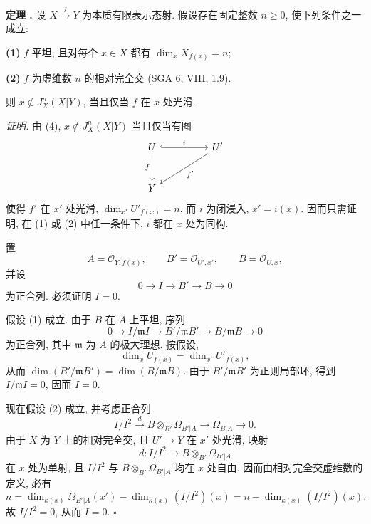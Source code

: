 
\medskip
\noindent\textbf{定理 .}
设 $X\xrightarrow{f}Y$ 为本质有限表示态射. 假设存在固定整数 $n\geq0$, 使下列条件之一成立:

\smallskip
\noindent\textbf{(1)} $f$ 平坦, 且对每个 $x\in X$ 都有 $\dim_xX_{f(x)}=n$;

\smallskip
\noindent\textbf{(2)} $f$ 为虚维数 $n$ 的相对完全交 (SGA 6, VIII, 1.9).

\smallskip
则 $x\notin J_X^n(X|Y)$, 当且仅当 $f$ 在 $x$ 处光滑.

\smallskip
\noindent\textit{证明.}
由 (4), $x\notin J_X^n(X|Y)$ 当且仅当有图
\[
\begin{tikzcd}[column sep=huge,row sep=large]
U \arrow[r,hook,"i"] \arrow[d,"f"']
  & U' \arrow[dl,"f'"] \\
Y & {}
\end{tikzcd}
\]
使得 $f'$ 在 $x'$ 处光滑, $\dim_{x'}U'_{f(x)}=n$, 而 $i$ 为闭浸入, $x'=i(x)$. 因而只需证明, 在 (1) 或 (2) 中任一条件下, $i$ 都在 $x$ 处为同构.

置
\[
A=\mathcal O_{Y,f(x)},\qquad
B'=\mathcal O_{U',x'},\qquad B=\mathcal O_{U,x},
\]
并设
\[
0\longrightarrow I\longrightarrow B'\longrightarrow B
\longrightarrow0
\]
为正合列. 必须证明 $I=0$.

假设 (1) 成立. 由于 $B$ 在 $A$ 上平坦, 序列
\[
0\longrightarrow I/\mathfrak mI
\longrightarrow B'/\mathfrak mB'
\longrightarrow B/\mathfrak mB\longrightarrow0
\]
为正合列, 其中 $\mathfrak m$ 为 $A$ 的极大理想. 按假设,
\[
\dim_xU_{f(x)}=\dim_{x'}U'_{f(x)},
\]
从而 $\dim(B'/\mathfrak mB')=\dim(B/\mathfrak mB)$. 由于 $B'/\mathfrak mB'$ 为正则局部环, 得到 $I/\mathfrak mI=0$, 因而 $I=0$.


现在假设 (2) 成立, 并考虑正合列
\[
I/I^2\xrightarrow{d}B\otimes_{B'}\Omega_{B'|A}
\longrightarrow\Omega_{B|A}\longrightarrow0.
\]
由于 $X$ 为 $Y$ 上的相对完全交, 且 $U'\longrightarrow Y$ 在 $x'$ 处光滑, 映射
\[
d:I/I^2\longrightarrow B\otimes_{B'}\Omega_{B'|A}
\]
在 $x$ 处为单射, 且 $I/I^2$ 与 $B\otimes_{B'}\Omega_{B'|A}$ 均在 $x$ 处自由. 因而由相对完全交虚维数的定义, 必有
\[
n=\dim_{\kappa(x)}\Omega_{B'|A}(x')
  -\dim_{\kappa(x)}(I/I^2)(x)
 =n-\dim_{\kappa(x)}(I/I^2)(x).
\]
故 $I/I^2=0$, 从而 $I=0$. \hfill$\square$

